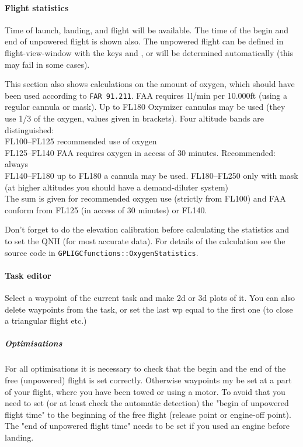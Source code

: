 \paragraph{Flight statistics}
Time of launch, landing, and flight will be available.
The time of the begin and end of unpowered flight is shown also.
The unpowered flight can be defined in flight-view-window with the keys  and , or will be determined automatically (this may fail in some cases).

This section also shows calculations on the amount of oxygen, which should have been used according to \texttt{FAR 91.211}.
FAA requires 1l/min per 10.000ft (using a regular cannula or mask). Up to FL180 Oxymizer cannulas may be used (they use 1/3 of the oxygen, values given in brackets).
Four altitude bands are distinguished: \\
FL100--FL125 recommended use of oxygen\\
FL125--FL140 FAA requires oxygen in access of 30 minutes. Recommended: always \\
FL140--FL180 up to FL180 a cannula may be used.
FL180--FL250 only with mask (at higher altitudes you should have a demand-diluter system)\\

The sum is given for recommended oxygen use (strictly from FL100) and FAA conform from FL125 (in access of 30 minutes) or FL140.

Don't forget to do the elevation calibration before calculating the statistics and to set the QNH (for most accurate data).
For details of the calculation see the source code in \texttt{GPLIGCfunctions::OxygenStatistics}.


\paragraph{Task editor}
Select a waypoint of the current task and make 2d or 3d plots of it.
You can also delete waypoints from the task, or set the last wp equal to the first
one (to close a triangular flight etc.)


\subparagraph{Optimisations} \label{optimise} For all optimisations it is necessary to check that the begin and the end of the free (unpowered) flight is set correctly.
Otherwise waypoints my be set at a part of your flight, where you have been towed or using a motor.
To avoid that you need to set (or at least check the automatic detection) the "begin of unpowered flight time" to the beginning of the free flight (release point or engine-off point). The "end of unpowered flight time" needs to be set if you used an engine before landing.


